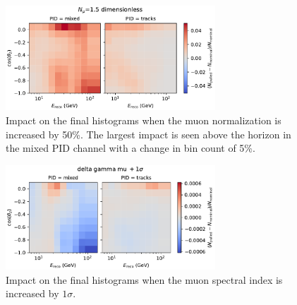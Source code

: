 \begin{figure}[H]
    \centering
    \includegraphics[width=0.7\textwidth,trim={0 0 0 0.6cm},clip]{figures/measurement/systematics/muons/weight_scale.pdf}
    \caption{Impact on the final histograms when the muon normalization is increased by 50\%. The largest impact is seen above the horizon in the mixed PID channel with a change in bin count of 5\%.}
    \label{fig:weight-scale-syst}
\end{figure}

\begin{figure}[H]
    \centering
    \includegraphics[width=0.7\textwidth,trim={0 0 0 0.6cm},clip]{figures/measurement/systematics/muons/delta_gamma_mu.pdf}
    \caption{Impact on the final histograms when the muon spectral index is increased by $1\sigma$.}
    \label{fig:delta-gamma-mu-syst}
\end{figure}